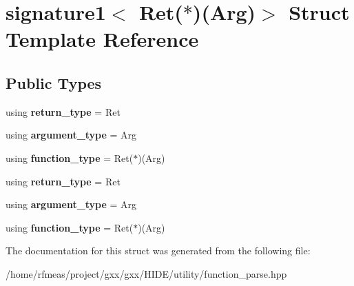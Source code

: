 \hypertarget{structsignature1_3_01Ret_07_5_08_07Arg_08_4}{}\section{signature1$<$ Ret($\ast$)(Arg)$>$ Struct Template Reference}
\label{structsignature1_3_01Ret_07_5_08_07Arg_08_4}
\subsection*{Public Types}
\begin{DoxyCompactItemize}
\item 
using {\bfseries return\+\_\+type} = Ret\hypertarget{structsignature1_3_01Ret_07_5_08_07Arg_08_4_a2c961028d4d73e051d1dd01c8f800237}{}\label{structsignature1_3_01Ret_07_5_08_07Arg_08_4_a2c961028d4d73e051d1dd01c8f800237}

\item 
using {\bfseries argument\+\_\+type} = Arg\hypertarget{structsignature1_3_01Ret_07_5_08_07Arg_08_4_acfae967db7535c9149e61e826493a134}{}\label{structsignature1_3_01Ret_07_5_08_07Arg_08_4_acfae967db7535c9149e61e826493a134}

\item 
using {\bfseries function\+\_\+type} = Ret($\ast$)(Arg)\hypertarget{structsignature1_3_01Ret_07_5_08_07Arg_08_4_ad3c77bf4bfe3cb00e9fcb3c99813fcec}{}\label{structsignature1_3_01Ret_07_5_08_07Arg_08_4_ad3c77bf4bfe3cb00e9fcb3c99813fcec}

\item 
using {\bfseries return\+\_\+type} = Ret\hypertarget{structsignature1_3_01Ret_07_5_08_07Arg_08_4_a2c961028d4d73e051d1dd01c8f800237}{}\label{structsignature1_3_01Ret_07_5_08_07Arg_08_4_a2c961028d4d73e051d1dd01c8f800237}

\item 
using {\bfseries argument\+\_\+type} = Arg\hypertarget{structsignature1_3_01Ret_07_5_08_07Arg_08_4_acfae967db7535c9149e61e826493a134}{}\label{structsignature1_3_01Ret_07_5_08_07Arg_08_4_acfae967db7535c9149e61e826493a134}

\item 
using {\bfseries function\+\_\+type} = Ret($\ast$)(Arg)\hypertarget{structsignature1_3_01Ret_07_5_08_07Arg_08_4_ad3c77bf4bfe3cb00e9fcb3c99813fcec}{}\label{structsignature1_3_01Ret_07_5_08_07Arg_08_4_ad3c77bf4bfe3cb00e9fcb3c99813fcec}

\end{DoxyCompactItemize}


The documentation for this struct was generated from the following file\+:\begin{DoxyCompactItemize}
\item 
/home/rfmeas/project/gxx/gxx/\+H\+I\+D\+E/utility/function\+\_\+parse.\+hpp\end{DoxyCompactItemize}
